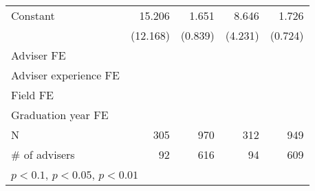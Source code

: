 {\begin{tabular}{l*{4}{D{.}{.}{-1}}}
\addlinespace
Constant                      	&         15.206         	&          1.651\sym{**} 	&          8.646\sym{**} 	&          1.726\sym{**} \\
                              	&       (12.168)         	&        (0.839)         	&        (4.231)         	&        (0.724)         \\
\addlinespace
Adviser FE                    	&     \checkmark         	&                        	&     \checkmark         	&                        \\
\addlinespace
Adviser experience FE         	&     \checkmark         	&     \checkmark         	&     \checkmark         	&     \checkmark         \\
\addlinespace
Field FE                      	&     \checkmark         	&     \checkmark         	&     \checkmark         	&     \checkmark         \\
\addlinespace
Graduation year FE            	&     \checkmark         	&     \checkmark         	&     \checkmark         	&     \checkmark         \\
\midrule
N                             	&            305         	&            970         	&            312         	&            949         \\
\# of advisers                	&             92         	&            616         	&             94         	&            609         \\
\bottomrule
{}\\
\end{tabular}
}
